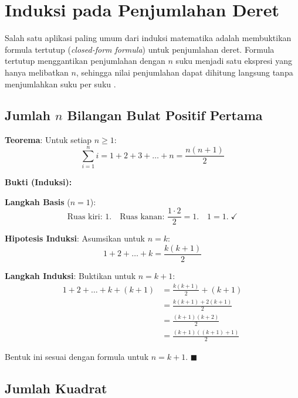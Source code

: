 \section{Induksi pada Penjumlahan Deret}

Salah satu aplikasi paling umum dari induksi matematika adalah membuktikan formula tertutup (\textit{closed-form formula}) untuk penjumlahan deret. Formula tertutup menggantikan penjumlahan dengan $n$ suku menjadi satu ekspresi yang hanya melibatkan $n$, sehingga nilai penjumlahan dapat dihitung langsung tanpa menjumlahkan suku per suku \cite{rosen2019}.

\subsection{Jumlah \texorpdfstring{$n$}{n} Bilangan Bulat Positif Pertama}

\begin{contoh}
\textbf{Teorema}: Untuk setiap $n \geq 1$:
\[ \sum_{i=1}^{n} i = 1 + 2 + 3 + \ldots + n = \frac{n(n+1)}{2} \]

\textbf{Bukti (Induksi):}

\textbf{Langkah Basis} ($n = 1$):
\[ \text{Ruas kiri: } 1. \quad \text{Ruas kanan: } \frac{1 \cdot 2}{2} = 1. \quad 1 = 1. \; \checkmark \]

\textbf{Hipotesis Induksi}: Asumsikan untuk $n = k$:
\[ 1 + 2 + \ldots + k = \frac{k(k+1)}{2} \]

\textbf{Langkah Induksi}: Buktikan untuk $n = k + 1$:
\begin{align*}
1 + 2 + \ldots + k + (k+1) &= \frac{k(k+1)}{2} + (k+1) \\
&= \frac{k(k+1) + 2(k+1)}{2} \\
&= \frac{(k+1)(k+2)}{2} \\
&= \frac{(k+1)((k+1)+1)}{2}
\end{align*}

Bentuk ini sesuai dengan formula untuk $n = k + 1$. $\blacksquare$
\end{contoh}

\subsection{Jumlah Kuadrat}

